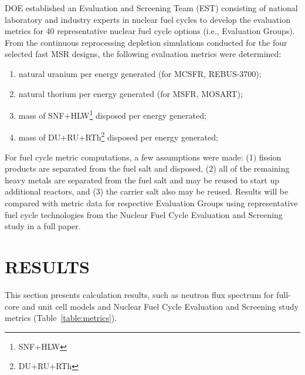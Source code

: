 \documentclass{anstrans}
\begin{document}
DOE established an Evaluation and Screening Team (EST) consisting of national laboratory and industry experts in nuclear fuel cycles to develop the evaluation metrics for 40 representative nuclear fuel cycle options (i.e., Evaluation Groups). From the continuous reprocessing depletion simulations conducted for the four selected fast \gls{MSR} designs, the following evaluation metrics were determined:
\vspace{-0.08in}
\begin{enumerate}
	\item natural uranium per energy generated (for \gls{MCSFR}, REBUS-3700);\vspace{-0.11in}
	\item natural thorium per energy generated (for \gls{MSFR}, \gls{MOSART});\vspace{-0.11in}
	\item mass of SNF+HLW\footnote{\gls{SNF}+\gls{HLW}} disposed per energy generated;\vspace{-0.11in}
	\item mass of DU+RU+RTh\footnote{\gls{DU}+\gls{RU}+\gls{RTh}} disposed per energy  generated;\vspace{-0.08in}
\end{enumerate}
For fuel cycle metric computations, a few assumptions were made: 
(1) fission products are separated from the fuel salt and disposed, 
(2) all of the remaining heavy metals are separated from the fuel salt and may be reused to start up additional reactors, and 
(3) the carrier salt also may be reused. 
Results will be compared with metric data for respective Evaluation Groups using representative fuel cycle technologies from the Nuclear Fuel Cycle Evaluation and Screening study \cite{wigeland_nuclear_2014} in a full paper.

\section{RESULTS} 
This section presents calculation results, such as neutron flux spectrum for full-core and unit cell models and Nuclear Fuel Cycle Evaluation and Screening study metrics (Table~\ref{table:metrics}).
\end{document}
